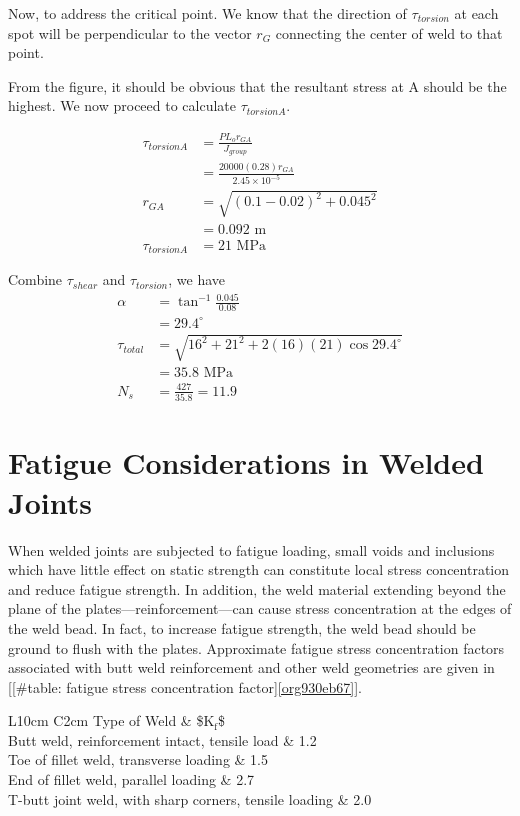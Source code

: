 \documentclass[a4paper,openany,12pt]{book}
\begin{document}
{{Now, to address the critical point. We know that the direction of
\(\tau_{torsion}\) at each spot will be perpendicular to the vector \(r_G\)
connecting the center of weld to that point.

From the figure, it should be obvious that the resultant stress at A
should be the highest. We now proceed to calculate \(\tau_{torsionA}\).

$$\begin{aligned}
    \tau_{torsionA} &= \frac{P L_o r_{GA}}{J_{group}} \\
                    &=\frac{20000(0.28) r_{GA}}{2.45 \times 10^{-5}} \\[1em]
    r_{GA} &= \sqrt{(0.1 - 0.02)^2 + 0.045^2} \\
                    &= 0.092 \text{ m} \\[1em]
    \tau_{torsionA} &= 21 \text{ MPa}
  \end{aligned}$$

Combine \(\tau_{shear}\) and \(\tau_{torsion}\), we have $$\begin{aligned}
    \alpha &= \tan^{-1} \frac{0.045}{0.08} \\
           &= 29.4^{\circ} \\[1em]
    \tau_{total} &= \sqrt{ 16^2 + 21^2 + 2(16)(21) \cos 29.4^{\circ} } \\
           &= 35.8 \text{ MPa} \\[1em]
    N_s &= \frac{427}{35.8} = 11.9
  \end{aligned}$$

\section{Fatigue Considerations in Welded Joints}
\label{sec:org8b27597}
When welded joints are subjected to fatigue loading, small voids and
inclusions which have little effect on static strength can constitute
local stress concentration and reduce fatigue strength. In addition, the
weld material extending beyond the plane of the
plates---reinforcement---can cause stress concentration at the edges of
the weld bead. In fact, to increase fatigue strength, the weld bead
should be ground to flush with the plates. Approximate fatigue stress
concentration factors associated with butt weld reinforcement and other
weld geometries are given in
[[\#table: fatigue stress concentration factor]\ref{org930eb67}].


 L10cm C2cm Type of Weld \& \$K\(_{\text{f}}\)\$\\
Butt weld, reinforcement intact, tensile load \& 1.2\\
Toe of fillet weld, transverse loading \& 1.5\\
End of fillet weld, parallel loading \& 2.7\\
T-butt joint weld, with sharp corners, tensile loading \& 2.0\\

}}
\end{document}
